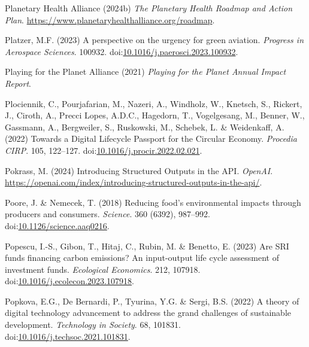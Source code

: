 \documentclass[
  letterpaper,
  DIV=11,
  numbers=noendperiod]{scrartcl}
\newlength{\cslhangindent}
\newenvironment{CSLReferences}[2] %
 {\begin{list}{}{%
  \setlength{\itemindent}{0pt}
  \setlength{\leftmargin}{0pt}
  \setlength{\parsep}{0pt}
  \ifodd #1
   \setlength{\leftmargin}{\cslhangindent}
   \setlength{\itemindent}{-1\cslhangindent}
  \fi
  \setlength{\itemsep}{#2\baselineskip}}}
 {\end{list}}
\begin{document}
\begin{CSLReferences}{0}{1}
Planetary Health Alliance (2024b) \emph{The {Planetary Health Roadmap}
and {Action Plan}}.
\url{https://www.planetaryhealthalliance.org/roadmap}.

Platzer, M.F. (2023) A perspective on the urgency for green aviation.
\emph{Progress in Aerospace Sciences}. 100932.
doi:\href{https://doi.org/10.1016/j.paerosci.2023.100932}{10.1016/j.paerosci.2023.100932}.

Playing for the Planet Alliance (2021) \emph{Playing for the {Planet
Annual Impact Report}}.

Plociennik, C., Pourjafarian, M., Nazeri, A., Windholz, W., Knetsch, S.,
Rickert, J., Ciroth, A., Precci Lopes, A.D.C., Hagedorn, T.,
Vogelgesang, M., Benner, W., Gassmann, A., Bergweiler, S., Ruskowski,
M., Schebek, L. \& Weidenkaff, A. (2022) Towards a {Digital Lifecycle
Passport} for the {Circular Economy}. \emph{Procedia CIRP}. 105,
122--127.
doi:\href{https://doi.org/10.1016/j.procir.2022.02.021}{10.1016/j.procir.2022.02.021}.

Pokrass, M. (2024) Introducing {Structured Outputs} in the {API}.
\emph{OpenAI}.
\url{https://openai.com/index/introducing-structured-outputs-in-the-api/}.

Poore, J. \& Nemecek, T. (2018) Reducing food's environmental impacts
through producers and consumers. \emph{Science}. 360 (6392), 987--992.
doi:\href{https://doi.org/10.1126/science.aaq0216}{10.1126/science.aaq0216}.

Popescu, I.-S., Gibon, T., Hitaj, C., Rubin, M. \& Benetto, E. (2023)
Are {SRI} funds financing carbon emissions? {An} input-output life cycle
assessment of investment funds. \emph{Ecological Economics}. 212,
107918.
doi:\href{https://doi.org/10.1016/j.ecolecon.2023.107918}{10.1016/j.ecolecon.2023.107918}.

Popkova, E.G., De Bernardi, P., Tyurina, Y.G. \& Sergi, B.S. (2022) A
theory of digital technology advancement to address the grand challenges
of sustainable development. \emph{Technology in Society}. 68, 101831.
doi:\href{https://doi.org/10.1016/j.techsoc.2021.101831}{10.1016/j.techsoc.2021.101831}.


\end{CSLReferences}
\end{document}
